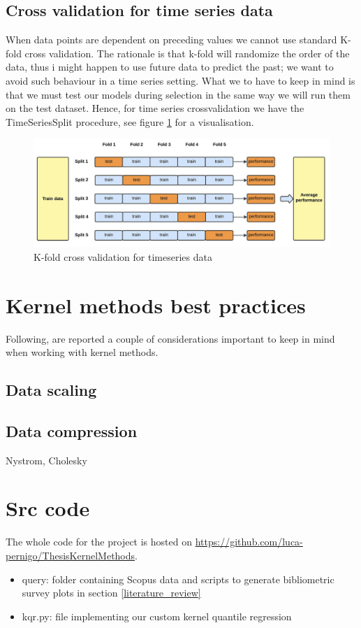 \subsection{Cross validation for time series data}
When data points are dependent on preceding values we cannot use standard K-fold cross validation. The rationale is that k-fold will randomize the order of the data, thus i might happen to use future data to predict the past; we want to avoid such behaviour in a time series setting. What we to have to keep in mind is that we must test our models during selection in the same way we will run them on the test dataset. Hence, for time series crossvalidation we have the TimeSeriesSplit procedure, see figure \ref{fig:crossvalidationtimeseries} for a visualisation.
\begin{figure}
    \includegraphics[width=\textwidth]{images/crossvalidationtimeseries.png}
    \caption{K-fold cross validation for timeseries data}
    \label{fig:crossvalidationtimeseries}
\end{figure}


\section{Kernel methods best practices}
Following, are reported a couple of considerations important to keep in mind when working with kernel methods.
\subsection{Data scaling}
\subsection{Data compression}
Nystrom, Cholesky

\newpage
\section{Src code}\label{src_code}
The whole code for the project is hosted on
\url{https://github.com/luca-pernigo/ThesisKernelMethods}\label{github_repo}.
\\
\begin{itemize}
    \item query: folder containing Scopus data and scripts to generate bibliometric survey plots in section \ref{literature_review}
    \item kqr.py: file implementing our custom kernel quantile regression
\end{itemize}
